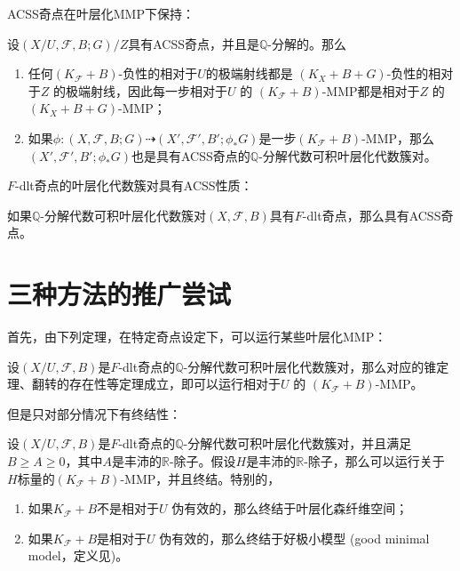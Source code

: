 ACSS奇点在叶层化MMP下保持：
\begin{proposition}\cite[Lemma 4.8]{acc_foliation}\label{acssmmp}
 设$(X/U,\mathcal{F},B;G)/Z$具有ACSS奇点，并且是$\mathbb{Q}$-分解的。那么 
 \begin{enumerate}
   \item 任何$(K_{\mathcal{F}}+B)$-负性的相对于$U$的极端射线都是 $(K_{X}+B+G)$-负性的相对于$Z$ 的极端射线，因此每一步相对于$U$ 的 $(K_{\mathcal{F}}+B)$-MMP都是相对于$Z$ 的$(K_{X}+B+G)$-MMP；
   \item 如果$\phi:(X,\mathcal{F},B;G) \dashrightarrow (X',\mathcal{F}',B';\phi_{*}G)$是一步$(K_{\mathcal{F}}+B)$-MMP，那么$(X',\mathcal{F}',B';\phi_{*}G)$也是具有ACSS奇点的$\mathbb{Q}$-分解代数可积叶层化代数簇对。
 \end{enumerate}
\end{proposition}
$F$-dlt奇点的叶层化代数簇对具有ACSS性质：
\begin{theorem}\cite[Theorem 17.0.1]{chlx}
 如果$\mathbb{Q}$-分解代数可积叶层化代数簇对$(X,\mathcal{F},B)$具有$F$-dlt奇点，那么具有ACSS奇点。  
\end{theorem}

\section{三种方法的推广尝试}
首先，由下列定理，在特定奇点设定下，可以运行某些叶层化MMP：
\begin{theorem}[叶层化MMP]\cite[Theorem 2.1.1]{chlx}
设$(X/U,\mathcal{F},B)$是$F$-dlt奇点的$\mathbb{Q}$-分解代数可积叶层化代数簇对，那么对应的锥定理、翻转的存在性等定理成立，即可以运行相对于$U$ 的 $(K_{\mathcal{F}}+B)$-MMP。  
\end{theorem}
但是只对部分情况下有终结性：
\begin{theorem}[叶层化MMP终结性]\cite[Theorem 2.1.2]{chlx}
设$(X/U,\mathcal{F},B)$是$F$-dlt奇点的$\mathbb{Q}$-分解代数可积叶层化代数簇对，并且满足$B\geqslant A \geqslant 0$，其中$A$是丰沛的$\mathbb{R}$-除子。假设$H$是丰沛的$\mathbb{R}$-除子，那么可以运行关于$H$标量的$(K_{\mathcal{F}}+B)$-MMP，并且终结。特别的，
\begin{enumerate}
  \item 如果$K_{\mathcal{F}}+B$不是相对于$U$ 伪有效的，那么终结于叶层化森纤维空间；
  \item 如果$K_{\mathcal{F}}+B$是相对于$U$ 伪有效的，那么终结于好极小模型 (good minimal model，定义见\cite[Definition 9.1.1]{chlx})。
\end{enumerate}
\end{theorem}

